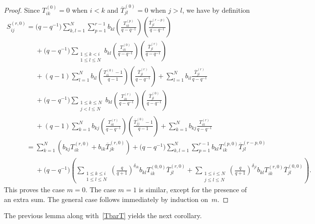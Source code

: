 \begin{proof}
Since $T_{ik}^{(0)}=0$ when $i<k$ and $\overline{T}_{jl}^{(0)}=0$ when $j>l$, we have by def\/inition
\begin{gather*}
S_{ij}^{(r,0)}= \big(q-q^{-1}\big) \sum\limits_{k,l=1}^N \sum\limits_{p=1}^{r-1} b_{kl} \left(\frac{T_{ik}^{(p)}}{q-q^{-1}}
\right) \left(\frac{\overline{T}_{jl}^{(r-p)}}{q-q^{-1}} \right)
\\
\phantom{S_{ij}^{(r,0)}=}{}
+ \big(q-q^{-1}\big)\sum\limits_{\substack{1 \leq k < i\\ 1 \leq l \leq N}} b_{kl} \left(\frac{T_{ik}^{(0)}}{q-q^{-1}} \right)
\left(\frac{\overline{T}_{jl}^{(r)}}{q-q^{-1}}\right)
\\
\phantom{S_{ij}^{(r,0)}=}{}
+ (q-1) \sum\limits_{l=1}^N b_{il} \left(\frac{T_{ii}^{(0)}-1}{q-1} \right)
\left(\frac{\overline{T}_{jl}^{(r)}}{q-q^{-1}}\right) + \sum\limits_{l=1}^N b_{il}
\frac{\overline{T}_{jl}^{(r)}}{q-q^{-1}}
\\
\phantom{S_{ij}^{(r,0)}=}{}
+ \big(q-q^{-1}\big) \sum\limits_{\substack{1 \leq k \leq N\\ j < l \leq N}} b_{kl} \left(\frac{T_{ik}^{(r)}}{q-q^{-1}} \right)
\left(\frac{\overline{T}_{jl}^{(0)}}{q-q^{-1}}\right)
\\
\phantom{S_{ij}^{(r,0)}=}{}
+ (q-1) \sum\limits_{k=1}^N b_{kj} \left(\frac{T_{ik}^{(r)}}{q-q^{-1}} \right)
\left(\frac{\overline{T}_{jj}^{(0)}-1}{q-1}\right) + \sum\limits_{k=1}^N b_{kj} \frac{T_{ik}^{(r)}}{q-q^{-1}}
\\
\phantom{S_{ij}^{(r,0)}}{}
= \sum\limits_{k=1}^N \left(b_{kj} T_{ik}^{(r,0)} + b_{ik} \overline{T}_{jk}^{(r,0)} \right) + \big(q-q^{-1}\big)
\sum\limits_{k,l=1}^N \sum\limits_{p=1}^{r-1} b_{kl} T_{ik}^{(p,0)} \overline{T}_{jl}^{(r-p,0)}
\\
\phantom{S_{ij}^{(r,0)}=}{}
+ \big(q-q^{-1}\big) \! \left(\sum\limits_{\substack{1 \leq k \leq i\\ 1 \leq l \leq N}}\! \left(\frac{q}{q+1}\right)^{\delta_{ik}}\!
b_{kl} T_{ik}^{(0,0)} \overline{T}_{jl}^{(r,0)} + \sum\limits_{\substack{1 \leq i \leq N\\ j \leq l \leq N}}\!
\left(\frac{q}{q+1}\right)^{\delta_{jl}} \! b_{kl} T_{ik}^{(r,0)} \overline{T}_{jl}^{(0,0)} \right).
\end{gather*}
This proves the case $m=0$.
The case $m=1$ is similar, except for the presence of an extra sum.
The general case follows immediately by induction on~$m$.
\end{proof}

The previous lemma along with~\eqref{TbarT} yields the next corollary.

